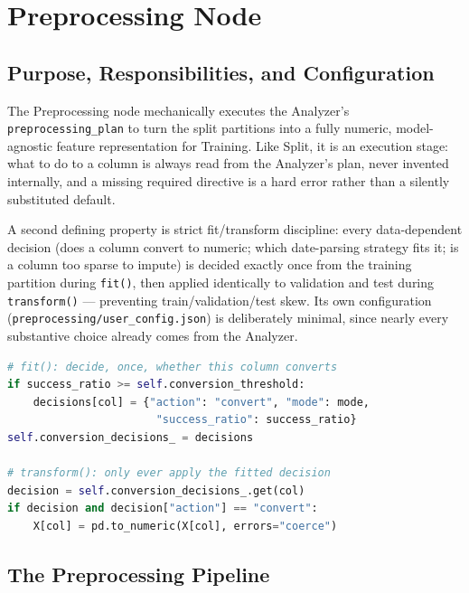 \section{Preprocessing Node}
\label{sec:impl-preprocessing}

\subsection{Purpose, Responsibilities, and Configuration}
\label{subsec:preprocessing-overview}

The Preprocessing node mechanically executes the Analyzer's \texttt{preprocessing\_plan} to turn the split partitions into a fully numeric, model-agnostic feature representation for Training. Like Split, it is an execution stage: what to do to a column is always read from the Analyzer's plan, never invented internally, and a missing required directive is a hard error rather than a silently substituted default.

A second defining property is strict fit/transform discipline: every data-dependent decision (does a column convert to numeric; which date-parsing strategy fits it; is a column too sparse to impute) is decided exactly once from the training partition during \texttt{fit()}, then applied identically to validation and test during \texttt{transform()} --- preventing train/validation/test skew. Its own configuration (\texttt{preprocessing/user\_config.json}) is deliberately minimal, since nearly every substantive choice already comes from the Analyzer.

\begin{lstlisting}[language=Python, caption={A numeric-conversion decision made once in \texttt{fit()}, only ever applied in \texttt{transform()}.}, label={lst:preprocessing-fit-transform}]
# fit(): decide, once, whether this column converts
if success_ratio >= self.conversion_threshold:
    decisions[col] = {"action": "convert", "mode": mode,
                       "success_ratio": success_ratio}
self.conversion_decisions_ = decisions

# transform(): only ever apply the fitted decision
decision = self.conversion_decisions_.get(col)
if decision and decision["action"] == "convert":
    X[col] = pd.to_numeric(X[col], errors="coerce")
\end{lstlisting}

\subsection{The Preprocessing Pipeline}
\label{subsec:preprocessing-pipeline}

